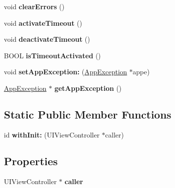 \begin{DoxyCompactItemize}
\item 
\hypertarget{interface_command_context_a825e3480a67375607d283ee875199745}{
void {\bfseries clear\-Errors} ()}
\label{interface_command_context_a825e3480a67375607d283ee875199745}

\item 
\hypertarget{interface_command_context_a2c6073266e4ec22ac6b6227ce56e2bd6}{
void {\bfseries activate\-Timeout} ()}
\label{interface_command_context_a2c6073266e4ec22ac6b6227ce56e2bd6}

\item 
\hypertarget{interface_command_context_a7c19633dd9421913e6a63078150583c8}{
void {\bfseries deactivate\-Timeout} ()}
\label{interface_command_context_a7c19633dd9421913e6a63078150583c8}

\item 
\hypertarget{interface_command_context_a5f72d0c0ca42b8502fa2580acbf62204}{
\-B\-O\-O\-L {\bfseries is\-Timeout\-Activated} ()}
\label{interface_command_context_a5f72d0c0ca42b8502fa2580acbf62204}

\item 
\hypertarget{interface_command_context_a489082496684047d76503079a74eac3e}{
void {\bfseries set\-App\-Exception\-:} (\hyperlink{interface_app_exception}{\-App\-Exception} $\ast$appe)}
\label{interface_command_context_a489082496684047d76503079a74eac3e}

\item 
\hypertarget{interface_command_context_a384335d72d424590c7e98f23b97bcc00}{
\hyperlink{interface_app_exception}{\-App\-Exception} $\ast$ {\bfseries get\-App\-Exception} ()}
\label{interface_command_context_a384335d72d424590c7e98f23b97bcc00}

\end{DoxyCompactItemize}
\subsection*{\-Static \-Public \-Member \-Functions}
\begin{DoxyCompactItemize}
\item 
\hypertarget{interface_command_context_a7e3659ae01648b7db18812a2b1e4cf5c}{
id {\bfseries with\-Init\-:} (\-U\-I\-View\-Controller $\ast$caller)}
\label{interface_command_context_a7e3659ae01648b7db18812a2b1e4cf5c}

\end{DoxyCompactItemize}
\subsection*{\-Properties}
\begin{DoxyCompactItemize}
\item 
\hypertarget{interface_command_context_a3da5c5d788e8d7402907548f7725614c}{
\-U\-I\-View\-Controller $\ast$ {\bfseries caller}}
\label{interface_command_context_a3da5c5d788e8d7402907548f7725614c}

\end{DoxyCompactItemize}


